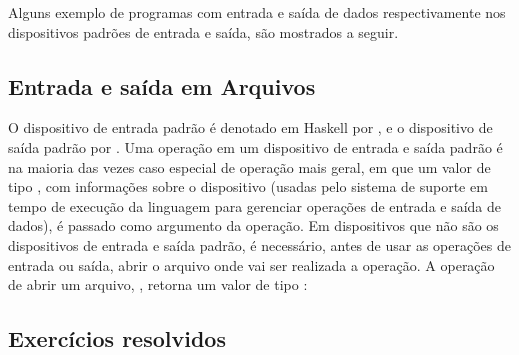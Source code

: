 Alguns exemplo de programas com entrada e saída de dados
respectivamente nos dispositivos padrões de entrada e saída, são
mostrados a seguir.

\subsection{Entrada e saída em Arquivos}
\label{ES-em-arquivos}

O dispositivo de entrada padrão é denotado em Haskell por ,
e o dispositivo de saída padrão por . Uma operação em um
dispositivo de entrada e saída padrão é na maioria das vezes caso
especial de operação mais geral, em que um valor de tipo ,
com informações sobre o dispositivo (usadas pelo sistema de suporte em
tempo de execução da linguagem para gerenciar operações de entrada e
saída de dados), é passado como argumento da operação. Em dispositivos
que não são os dispositivos de entrada e saída padrão, é necessário,
antes de usar as operações de entrada ou saída, abrir o arquivo onde
vai ser realizada a operação. A operação de abrir um arquivo,
, retorna um valor de tipo :


\subsection{Exercícios resolvidos}
\label{ex-IO-resolvidos}

